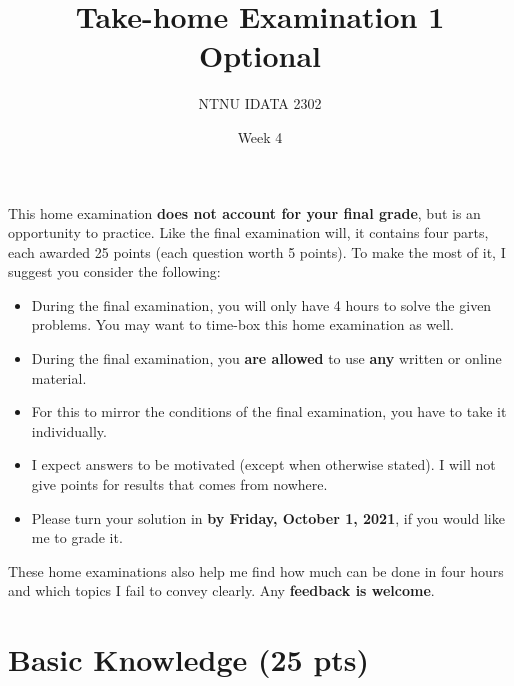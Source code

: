 \documentclass[11pt]{article}
\author{NTNU IDATA 2302}
\date{Week 4}
\title{Take-home Examination 1\\\medskip
\large Optional}
\begin{document}
\maketitle
This home examination \textbf{does not account for your final grade}, but is
an opportunity to practice. Like the final examination will, it
contains four parts, each awarded 25 points (each question worth 5
points). To make the most of it, I suggest you consider the following:
\begin{itemize}
\item During the final examination, you will only have 4 hours to solve
the given problems. You may want to time-box this home examination
as well.
\item During the final examination, you \textbf{are allowed} to use \textbf{any} written
or online material.
\item For this to mirror the conditions of the final examination, you
have to take it individually.
\item I expect answers to be motivated (except when otherwise stated). I
will not give points for results that comes from nowhere.
\item Please turn your solution in \textbf{by Friday, October 1, 2021}, if you
would like me to grade it.
\end{itemize}

These home examinations also help me find how much can be done in four
hours and which topics I fail to convey clearly. Any \textbf{feedback is
welcome}.



\section{Basic Knowledge (25 pts)}
\label{sec:orgf005d70}
\end{document}

